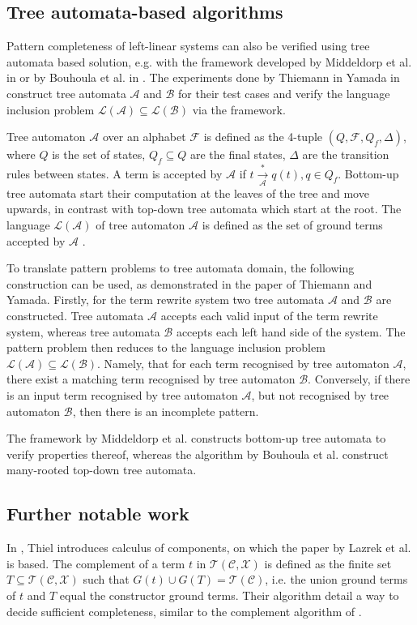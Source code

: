 \subsection{Tree automata-based algorithms}
Pattern completeness of left-linear systems can also be verified using tree automata based solution, e.g. with the framework developed by Middeldorp et al. in \cite{middeldorp} or by Bouhoula et al. in \cite{bouhoula}. The experiments done by Thiemann in Yamada in \cite{thiemann} construct tree automata $\mathcal{A}$ and $\mathcal{B}$ for their test cases and verify the language inclusion problem $\mathcal{L}(\mathcal{A}) \subseteq \mathcal{L}(\mathcal{B})$ via the framework. 

Tree automaton $\mathcal{A}$ over an alphabet $\mathcal{F}$ is defined as the 4-tuple $(Q,\mathcal{F},Q_f,\Delta)$, where $Q$ is the set of states, $Q_f \subseteq Q$ are the final states, $\Delta$ are the transition rules between states. A term is accepted by $\mathcal{A}$ if $t \xrightarrow[\mathcal{A}]{*} q(t), q \in Q_f$. Bottom-up tree automata start their computation at the leaves of the tree and move upwards, in contrast with top-down tree automata which start at the root. The language $\mathcal{L}(\mathcal{A})$ of tree automaton $\mathcal{A}$ is defined as the set of ground terms accepted by $\mathcal{A}$ \cite{tata}.

To translate pattern problems to tree automata domain, the following construction can be used, as demonstrated in the paper of Thiemann and Yamada\cite{thiemann}. Firstly, for the term rewrite system two tree automata $\mathcal{A}$ and $\mathcal{B}$ are constructed. Tree automata $\mathcal{A}$ accepts each valid input of the term rewrite system, whereas tree automata $\mathcal{B}$ accepts each left hand side of the system. The pattern problem then reduces to the language inclusion problem $\mathcal{L}(\mathcal{A}) \subseteq \mathcal{L}(\mathcal{B})$. Namely, that for each term recognised by tree automaton $\mathcal{A}$, there exist a matching term recognised by tree automaton $\mathcal{B}$. Conversely, if there is an input term recognised by tree automaton $\mathcal{A}$, but not recognised by tree automaton $\mathcal{B}$, then there is an incomplete pattern.

The framework by Middeldorp et al. \cite{middeldorp} constructs bottom-up tree automata to verify properties thereof, whereas the algorithm by Bouhoula et al. \cite{bouhoula} construct many-rooted top-down tree automata.

\subsection{Further notable work} \label{notable-work}
In \cite{thiel}, Thiel introduces calculus of components, on which the paper by Lazrek et al. is based. The complement of a term $t$ in $\mathcal{T}(\mathcal{C}, \mathcal{X})$ is defined as the finite set $T \subseteq \mathcal{T}(\mathcal{C}, \mathcal{X})$ such that $G(t) \cup G(T) = \mathcal{T}(\mathcal{C})$, i.e. the union ground terms of $t$ and $T$ equal the constructor ground terms. Their algorithm detail a way to decide sufficient completeness, similar to the complement algorithm of \cite{lazrek}.

